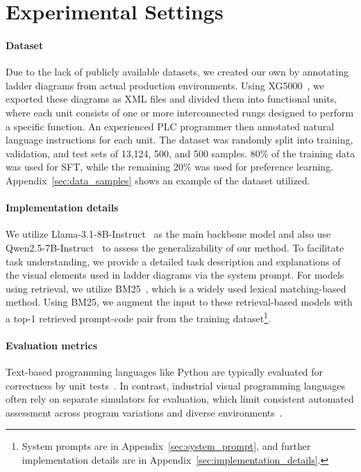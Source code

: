 

\section{Experimental Settings}\label{sec:exp_setup}
\paragraph{Dataset} Due to the lack of publicly available datasets, we created our own by annotating ladder diagrams from actual production environments. Using XG5000~\cite{XG5000Manual}, we exported these diagrams as XML files and divided them into functional units, where each unit consists of one or more interconnected rungs designed to perform a specific function. An experienced PLC programmer then annotated natural language instructions for each unit. The dataset was randomly split into training, validation, and test sets of 13,124, 500, and 500 samples. 80\% of the training data was used for SFT, while the remaining 20\% was used for preference learning. Appendix~\ref{sec:data_samples} shows an example of the dataset utilized.

\paragraph{Implementation details} We utilize Llama-3.1-8B-Instruct~\cite{dubey2024llama} as the main backbone model and also use Qwen2.5-7B-Instruct~\cite{yang2024qwen2} to assess the generalizability of our method. To facilitate task understanding, we provide a detailed task description and explanations of the visual elements used in ladder diagrams via the system prompt. For models using retrieval, we utilize BM25~\cite{robertson2009probabilistic}, which is a widely used lexical matching-based method. Using BM25, we augment the input to these retrieval-based models with a top-1 retrieved prompt-code pair from the training dataset\footnote{System prompts are in Appendix~\ref{sec:system_prompt}, and further implementation details are in Appendix~\ref{sec:implementation_details}.}.

\paragraph{Evaluation metrics}
Text-based programming languages like Python are typically evaluated for correctness by unit tests~\cite{chen2021evaluating,austin2021programsynthesislargelanguage, chen2023codet}. In contrast, industrial visual programming languages often rely on separate simulators for evaluation, which limit consistent automated assessment across program variations and diverse environments~\cite{ray2017survey, ren2024infiniteworldunifiedscalablesimulation}.

